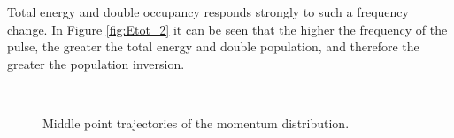 Total energy and double occupancy responds strongly to such a frequency change. In Figure \ref{fig:Etot_2} it can be seen that the higher the frequency of the pulse, the greater the total energy and double population, and therefore the greater the population inversion.

\begin{figure}[h!]
 \\
\caption{Middle point trajectories of the momentum distribution.}
\label{fig:Pulse_p_2}
\end{figure}


